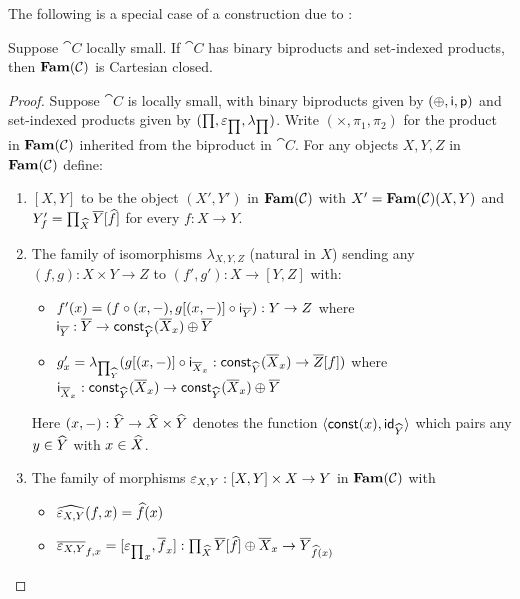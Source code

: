 The following is a special case of a construction due to \citet{nunes2023}:

\begin{proposition}
Suppose $\cat{C}$ locally small. If $\cat{C}$ has binary biproducts and set-indexed products, then
$\mathbf{Fam}(\mathcal{C})$ is Cartesian closed.
\end{proposition}

\begin{proof}
Suppose $\cat{C}$ is locally small, with binary biproducts given by $(\oplus,\mathsf{i},\mathsf{p})$ and set-indexed
products given by $(\prod,\varepsilon_{\prod},\lambda_{\prod})$. Write $(\times,\pi_1,\pi_2)$ for the product in
$\mathbf{Fam}(\mathcal{C})$ inherited from the biproduct in $\cat{C}$. For any objects $X, Y, Z$ in $\mathbf{Fam}(\mathcal{C})$
define:

\begin{enumerate}
\item $[X, Y]$ to be the object $(X',Y')$ in $\mathbf{Fam}(\mathcal{C})$ with $X' = \mathbf{Fam}(\mathcal{C})(X,Y)$ and $Y'_f =
\prod_{\widehat{X}}\overline{Y}[\widehat{f}]$ for every $f: X \to Y$.
\item The family of isomorphisms $\lambda_{X,Y,Z}$ (natural in $X$) sending any $(f, g): X \times Y \to Z$ to
$(f', g'): X \to [Y, Z]$ with:
\begin{itemize}
\item $f'(x) = (f \circ (x, -), g[(x,-)] \circ \mathsf{i}_{\overline{Y}}):
Y \to Z$ where $\mathsf{i}_{\overline{Y}}: \overline{Y} \to \mathsf{const}_{\widehat{Y}}(\overline{X}_x) \oplus \overline{Y}$
\item $g'_x = \lambda_{\prod_{\widehat{Y}}}(g[(x,-)] \circ \mathsf{i}_{\overline{X}_x}:
\mathsf{const}_{\widehat{Y}}(\overline{X}_x) \to \overline{Z}[f])$ where $\mathsf{i}_{\overline{X}_x}: \mathsf{const}_{\widehat{Y}}(\overline{X}_x)
\to \mathsf{const}_{\widehat{Y}}(\overline{X}_x) \oplus \overline{Y}$
\end{itemize}
Here $(x,-): \widehat{Y} \to \widehat{X} \times \widehat{Y}$ denotes the function $\langle \mathsf{const}(x), \mathsf{id}_{\widehat{Y}}\rangle$ which
pairs any $y \in \widehat{Y}$ with $x \in \widehat{X}$.
\item The family of morphisms $\varepsilon_{X,Y}: [X, Y] \times X \to Y$ in $\mathbf{Fam}(\mathcal{C})$ with
\begin{itemize}
\item $\widehat{\varepsilon_{X,Y}}(f, x) = \widehat{f}(x)$
\item $\overline{\varepsilon_{X,Y}}_{f, x} = [{\varepsilon_{\prod}}_x, \overline{f}_x]:
\prod_{\widehat{X}}\overline{Y}[\widehat{f}] \oplus \overline{X}_x \to \overline{Y}_{\widehat{f}(x)}$
\end{itemize}
\end{enumerate}


\end{proof}
